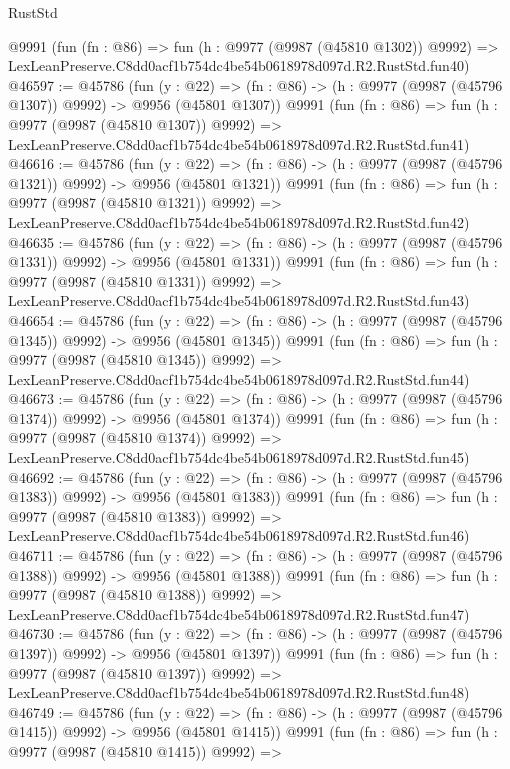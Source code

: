\begin{lexlean}{RustStd}
\begin{coremodule}
    @9991
    (fun (fn : @86) =>
    fun (h : @9977 (@9987 (@45810 @1302)) @9992) =>
    LexLeanPreserve.C8dd0acf1b754dc4be54b0618978d097d.R2.RustStd.fun40)
@46597 := @45786
    (fun (y : @22) =>
    (fn : @86) -> (h : @9977 (@9987 (@45796 @1307)) @9992) -> @9956 (@45801 @1307))
    @9991
    (fun (fn : @86) =>
    fun (h : @9977 (@9987 (@45810 @1307)) @9992) =>
    LexLeanPreserve.C8dd0acf1b754dc4be54b0618978d097d.R2.RustStd.fun41)
@46616 := @45786
    (fun (y : @22) =>
    (fn : @86) -> (h : @9977 (@9987 (@45796 @1321)) @9992) -> @9956 (@45801 @1321))
    @9991
    (fun (fn : @86) =>
    fun (h : @9977 (@9987 (@45810 @1321)) @9992) =>
    LexLeanPreserve.C8dd0acf1b754dc4be54b0618978d097d.R2.RustStd.fun42)
@46635 := @45786
    (fun (y : @22) =>
    (fn : @86) -> (h : @9977 (@9987 (@45796 @1331)) @9992) -> @9956 (@45801 @1331))
    @9991
    (fun (fn : @86) =>
    fun (h : @9977 (@9987 (@45810 @1331)) @9992) =>
    LexLeanPreserve.C8dd0acf1b754dc4be54b0618978d097d.R2.RustStd.fun43)
@46654 := @45786
    (fun (y : @22) =>
    (fn : @86) -> (h : @9977 (@9987 (@45796 @1345)) @9992) -> @9956 (@45801 @1345))
    @9991
    (fun (fn : @86) =>
    fun (h : @9977 (@9987 (@45810 @1345)) @9992) =>
    LexLeanPreserve.C8dd0acf1b754dc4be54b0618978d097d.R2.RustStd.fun44)
@46673 := @45786
    (fun (y : @22) =>
    (fn : @86) -> (h : @9977 (@9987 (@45796 @1374)) @9992) -> @9956 (@45801 @1374))
    @9991
    (fun (fn : @86) =>
    fun (h : @9977 (@9987 (@45810 @1374)) @9992) =>
    LexLeanPreserve.C8dd0acf1b754dc4be54b0618978d097d.R2.RustStd.fun45)
@46692 := @45786
    (fun (y : @22) =>
    (fn : @86) -> (h : @9977 (@9987 (@45796 @1383)) @9992) -> @9956 (@45801 @1383))
    @9991
    (fun (fn : @86) =>
    fun (h : @9977 (@9987 (@45810 @1383)) @9992) =>
    LexLeanPreserve.C8dd0acf1b754dc4be54b0618978d097d.R2.RustStd.fun46)
@46711 := @45786
    (fun (y : @22) =>
    (fn : @86) -> (h : @9977 (@9987 (@45796 @1388)) @9992) -> @9956 (@45801 @1388))
    @9991
    (fun (fn : @86) =>
    fun (h : @9977 (@9987 (@45810 @1388)) @9992) =>
    LexLeanPreserve.C8dd0acf1b754dc4be54b0618978d097d.R2.RustStd.fun47)
@46730 := @45786
    (fun (y : @22) =>
    (fn : @86) -> (h : @9977 (@9987 (@45796 @1397)) @9992) -> @9956 (@45801 @1397))
    @9991
    (fun (fn : @86) =>
    fun (h : @9977 (@9987 (@45810 @1397)) @9992) =>
    LexLeanPreserve.C8dd0acf1b754dc4be54b0618978d097d.R2.RustStd.fun48)
@46749 := @45786
    (fun (y : @22) =>
    (fn : @86) -> (h : @9977 (@9987 (@45796 @1415)) @9992) -> @9956 (@45801 @1415))
    @9991
    (fun (fn : @86) =>
    fun (h : @9977 (@9987 (@45810 @1415)) @9992) =>

\end{coremodule}
\end{lexlean}
